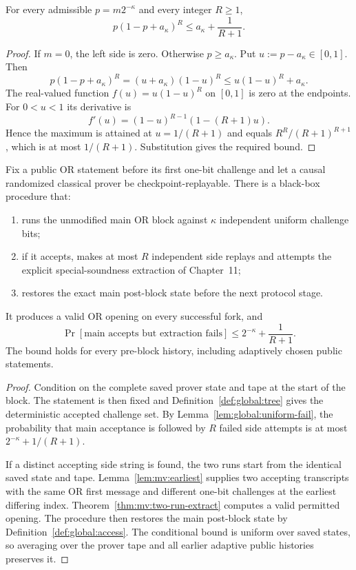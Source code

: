 \begin{lemma}\label{lem:global:uniform-fail}
For every admissible
$p=m2^{-\kappa}$ and every integer
$R\ge1$,
\[
 \boxed{
 p(1-p+a_\kappa)^R
 \le a_\kappa+\frac{1}{R+1}.}
\]
\end{lemma}
\begin{proof}
If $m=0$, the left side is zero.
Otherwise $p\ge a_\kappa$.
Put $u:=p-a_\kappa\in[0,1]$.
Then
\[
 p(1-p+a_\kappa)^R
 =(u+a_\kappa)(1-u)^R
 \le u(1-u)^R+a_\kappa.
\]
The real-valued function
$f(u)=u(1-u)^R$ on $[0,1]$
is zero at the endpoints.
For $0<u<1$ its derivative is
\[
 f'(u)=(1-u)^{R-1}(1-(R+1)u).
\]
Hence the maximum is attained at
$u=1/(R+1)$ and equals
$R^R/(R+1)^{R+1}$,
which is at most $1/(R+1)$.
Substitution gives the required bound.
\end{proof}

\begin{theorem}\label{thm:global:one-block}
Fix a public OR statement before its
first one-bit challenge and let a causal
randomized classical prover be
checkpoint-replayable.
There is a black-box procedure that:
\begin{enumerate}[label=\textup{(\roman*)}]
\item runs the unmodified main OR block
against $\kappa$ independent uniform
challenge bits;
\item if it accepts, makes at most $R$
independent side replays and attempts
the explicit special-soundness
extraction of Chapter~11;
\item restores the exact main post-block
state before the next protocol stage.
\end{enumerate}
It produces a valid OR opening
on every successful fork, and
\[
 \boxed{
 \Pr[\text{main accepts but extraction fails}]
 \le 2^{-\kappa}+\frac{1}{R+1}.}
\]
The bound holds for every pre-block
history, including adaptively
chosen public statements.
\end{theorem}
\begin{proof}
Condition on the complete saved
prover state and tape at the start
of the block. The statement is
then fixed and
Definition~\ref{def:global:tree}
gives the deterministic accepted
challenge set.
By Lemma~\ref{lem:global:uniform-fail},
the probability that main acceptance
is followed by $R$ failed side
attempts is at most
$2^{-\kappa}+1/(R+1)$.

If a distinct accepting side string
is found, the two runs start from
the identical saved state and tape.
Lemma~\ref{lem:mv:earliest}
supplies two accepting transcripts
with the same OR first message
and different one-bit challenges
at the earliest differing index.
Theorem~\ref{thm:mv:two-run-extract}
computes a valid permitted opening.
The procedure then restores the main
post-block state by
Definition~\ref{def:global:access}.
The conditional bound is uniform
over saved states, so averaging
over the prover tape and all
earlier adaptive public histories
preserves it.
\end{proof}

